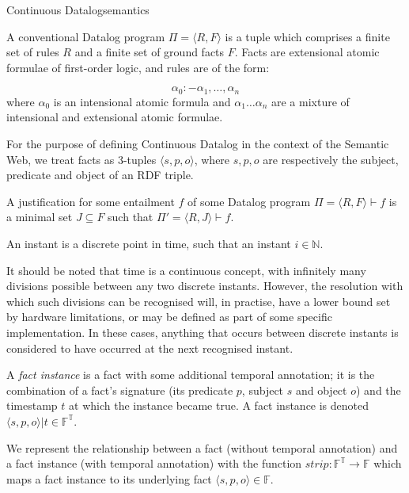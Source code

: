\begin{nestedsection}{Continuous Datalog}{semantics}
\begin{definition}[Datalog]
A conventional Datalog program $\Pi = \langle R, F\rangle$ is a tuple
which comprises a finite set of rules $R$ and a finite set of ground
facts $F$. Facts are extensional atomic formulae of first-order logic,
and rules are of the form:

\[\alpha_0 :- \alpha_1 , \ldots , \alpha_n\]
where $\alpha_0$ is an intensional atomic formula and
$\alpha_1 \ldots \alpha_n$ are a mixture of intensional and
extensional atomic formulae.

For the purpose of defining Continuous Datalog in the context of the
Semantic Web, we treat facts as 3-tuples $\langle s, p, o \rangle$,
where $s, p, o$ are respectively the subject, predicate and object of
an RDF triple. 
\end{definition}

\begin{definition}
A justification for some entailment $f$ of some Datalog program
${\Pi = \langle R , F \rangle \vdash f}$ is a minimal set ${J \subseteq F}$
such that ${\Pi' = \langle R , J \rangle \vdash f}$.
\end{definition}

\begin{definition}[Instant]
An instant is a discrete point in time, such that an instant 
${i \in \mathbb{N}}$.

It should be noted that time is a continuous concept, with infinitely
many divisions possible between any two discrete instants.  However,
the resolution with which such divisions can be recognised will, in
practise, have a lower bound set by hardware limitations, or may be
defined as part of some specific implementation.  In these cases,
anything that occurs between discrete instants is considered to have
occurred at the next recognised instant.
\end{definition}

\begin{definition}
A {\em fact instance} is a fact with some additional temporal annotation;
it is the combination of a fact's signature (its predicate $p$, subject
$s$ and object $o$) and the timestamp $t$ at which the instance became true.
A fact instance is denoted ${\langle s, p, o \rangle | t \in \mathbb{F^T}}$.

We represent the relationship between a fact (without temporal
annotation) and a fact instance (with temporal annotation) with the
function ${strip : \mathbb{F^T} \rightarrow \mathbb{F}}$ which maps a fact instance to its
underlying fact ${\langle s, p, o \rangle \in \mathbb{F}}$.
\end{definition}


\end{nestedsection}

